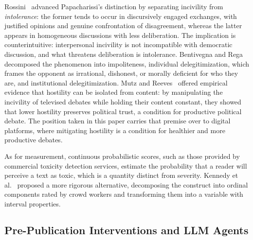 \documentclass[conference]{IEEEtran}
\begin{document}
Rossini~\cite{rossini2022beyond} advanced Papacharissi's distinction by
separating incivility from \textit{intolerance}: the former tends to occur in
discursively engaged exchanges, with justified opinions and genuine
confrontation of disagreement, whereas the latter appears in homogeneous
discussions with less deliberation. The implication is counterintuitive:
interpersonal incivility is not incompatible with democratic discussion, and
what threatens deliberation is intolerance. Bentivegna and
Rega~\cite{bentivegna2022searching} decomposed the phenomenon into
impoliteness, individual delegitimization, which frames the opponent as
irrational, dishonest, or morally deficient for who they are, and
institutional delegitimization. Mutz and Reeves~\cite{mutz2005new} offered
empirical evidence that hostility can be isolated from content: by
manipulating the incivility of televised debates while holding their content
constant, they showed that lower hostility preserves political trust, a condition for productive political debate. The
position taken in this paper carries that premise over to digital platforms,
where mitigating hostility is a condition for healthier and more productive
debates.

As for measurement, continuous probabilistic scores, such as those provided by
commercial toxicity detection services, estimate the probability that a
reader will perceive a text as toxic, which is a quantity distinct from
severity. Kennedy et al.~\cite{kennedy2020constructing} proposed a more
rigorous alternative, decomposing the construct into ordinal components rated
by crowd workers and transforming them into a variable with interval
properties.

\subsection{Pre-Publication Interventions and LLM Agents}\label{sec:interventions}
\end{document}
